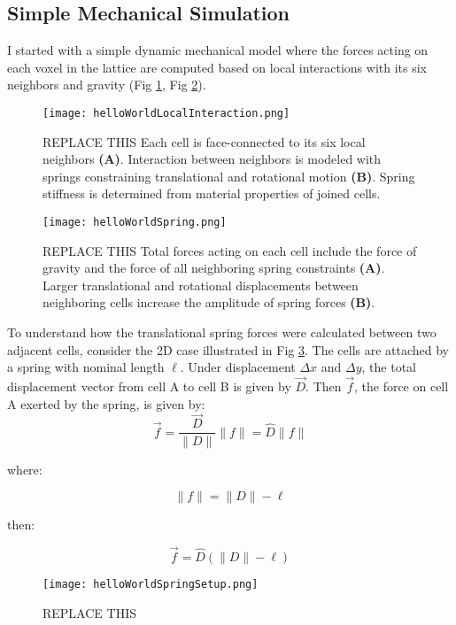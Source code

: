 {\subsection{Simple Mechanical Simulation}

I started with a simple dynamic mechanical model where the forces acting on each voxel in the lattice are computed based on local interactions with its six neighbors and gravity (Fig \ref{fig: helloWorldLocalInteraction}, Fig \ref{fig: helloWorldSpring}).

\begin{figure}
  \texttt{[image: helloWorldLocalInteraction.png]}
  \caption{REPLACE THIS Each cell is face-connected to its six local neighbors \textbf{(A)}.  Interaction between neighbors is modeled with springs constraining translational and rotational motion \textbf{(B)}.  Spring stiffness is determined from material properties of joined cells.}
  \label{fig: helloWorldLocalInteraction}
\end{figure}

\begin{figure}
  \texttt{[image: helloWorldSpring.png]}
  \caption{REPLACE THIS Total forces acting on each cell include the force of gravity and the force of all neighboring spring constraints \textbf{(A)}. Larger translational and rotational displacements between neighboring cells increase the amplitude of spring forces \textbf{(B)}.}
  \label{fig: helloWorldSpring}
\end{figure}

To understand how the translational spring forces were calculated between two adjacent cells, consider the 2D case illustrated in Fig \ref{fig: helloWorldSpringSetup}.  The cells are attached by a spring with nominal length $\ell$.  Under displacement $\Delta x$ and $\Delta y$, the total displacement vector from cell A to cell B is given by $\vec{D}$.  Then $\vec{f}$, the force on cell A exerted by the spring, is given by:\\

\[ \vec{f} =  \frac{\vec{D}}{\|D\|} \|f\| = \hat{D} \|f\|\]

where:

\[ \|f\| = \|D\| - \ell\]

then:

\[ \vec{f} = \hat{D} (\|D\| - \ell)\]



\begin{figure}
  \texttt{[image: helloWorldSpringSetup.png]}
  \caption{REPLACE THIS }
  \label{fig: helloWorldSpringSetup}
\end{figure}





}

